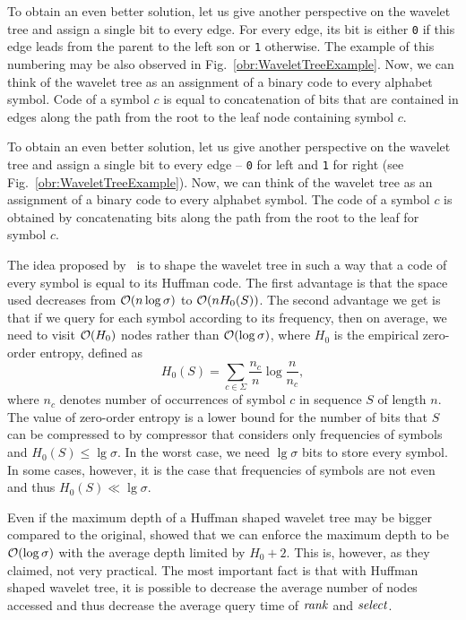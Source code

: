 To obtain an even better solution, let us give another perspective on the wavelet tree and assign
a single bit to every edge. For every edge, its bit is either {\tt 0} if this edge leads from
the parent to the left son or {\tt 1} otherwise. The example of this numbering may be also
observed in Fig.~\ref{obr:WaveletTreeExample}. Now, we can think of the wavelet tree as an
assignment of a binary code to every alphabet symbol. Code of a symbol $c$ is equal to
concatenation of bits that are contained in edges along the path from the root to the leaf node
containing symbol $c$.

To obtain an even better solution, let us give another perspective on the wavelet tree and assign
a single bit to every edge -- {\tt 0} for left and {\tt 1} for right (see Fig.~\ref{obr:WaveletTreeExample}).
Now, we can think of the wavelet tree as an assignment of a binary code to every alphabet symbol.
The code of a symbol $c$ is obtained by concatenating bits along the path from the root to the leaf
for symbol $c$.

The idea proposed by~\cite{makinen2005succinct} is to shape the wavelet tree in such a way that
a code of every symbol is equal to its Huffman code. The first advantage is that the space used
decreases from $\mathcal{O}(n\log \sigma)$ to $\mathcal{O}(nH_0(S))$. The second advantage we get is that if
we query for each symbol according to its frequency, then on average, we need to visit
$\mathcal{O}(H_0)$ nodes rather than $\mathcal{O}(\log \sigma)$, where $H_0$ is the empirical zero-order
entropy, defined as $$H_0(S)=\sum_{c\in\Sigma} \frac{n_c}{n} \log \frac{n}{n_c},$$
where $n_c$ denotes number of occurrences of symbol $c$ in sequence $S$ of length $n$. The value
of zero-order entropy is a lower bound for the number of bits that $S$ can be compressed to by
compressor that considers only frequencies of symbols and $H_0(S)\leq \lg\sigma$. In the worst
case, we need $\lg \sigma$ bits to store every symbol. In some cases, however, it is the case
that frequencies of symbols are not even and thus $H_0(S)\ll \lg\sigma$.

Even if the maximum depth of a Huffman shaped wavelet tree may be bigger compared to the original,
\cite{grabowski2004first} showed that we can enforce the maximum depth to be $\mathcal{O}(\log \sigma)$
with the average depth limited by $H_0+2$. This is, however, as they claimed, not very practical.
The most important fact is that with Huffman shaped wavelet tree, it is possible to decrease the
average number of nodes accessed and thus decrease the average query time of $\mathit{rank}$ and $\mathit{select}$.

